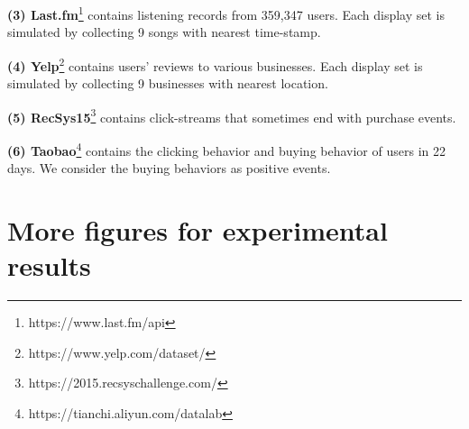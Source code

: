 \documentclass{article} %
\begin{document}
{\bf (3) Last.fm}\footnote{https://www.last.fm/api} contains listening records from 359,347 users. Each display set is simulated by collecting 9 songs with nearest time-stamp. 

{\bf (4) Yelp}\footnote{https://www.yelp.com/dataset/} contains users' reviews to various businesses. Each display set is simulated by collecting 9 businesses with nearest location. 

{\bf (5) RecSys15}\footnote{https://2015.recsyschallenge.com/} contains click-streams that sometimes end with purchase events. 

{\bf (6) Taobao}\footnote{https://tianchi.aliyun.com/datalab} contains the clicking behavior and buying behavior of users in 22 days. We consider the buying behaviors as positive events.
\section{More figures for experimental results}\label{app:experiment}
\end{document}
